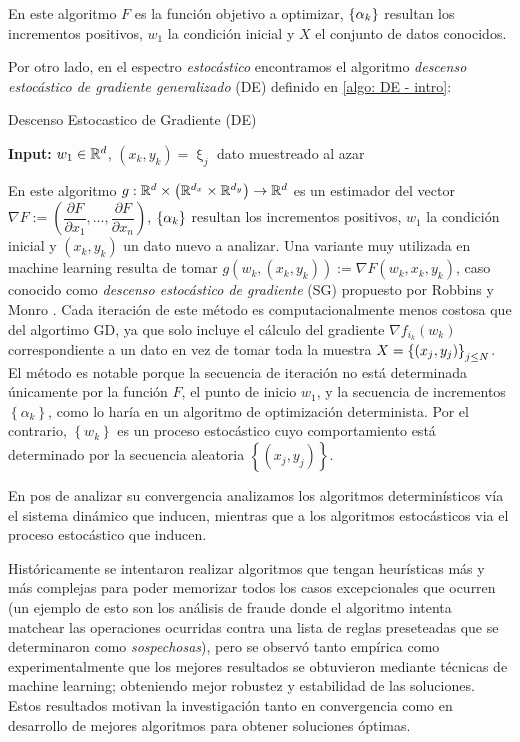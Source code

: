 En este algoritmo $F$ es la funci\'on objetivo a optimizar, $\left\lbrace\alpha_k\right\rbrace$ resultan los incrementos positivos, $w_1$ la condici\'on inicial y $X$ el conjunto de datos conocidos. 

Por otro lado, en el espectro \textit{estoc\'astico} encontramos el algoritmo \textit{descenso estoc\'astico de gradiente generalizado} (DE) definido en \ref{algo: DE - intro}:

 \LinesNumbered
 \begin{algorithm}[H]
 	\caption{Descenso Estocastico de Gradiente (DE) \label{algo: DE - intro}}
 	\textbf{Input:} $w_1 \in {\mathbb{R}}^d$, $(x_k, y_k) = \upxi_j$ dato muestreado al azar\\
 \end{algorithm}

En este algoritmo $g : {\mathbb{R}}^d \times \left( {\mathbb{R}}^{d_x} \times {\mathbb{R}}^{d_y} \right) \rightarrow {\mathbb{R}}^d$ es un estimador del vector $\nabla F := \left(\dfrac{\partial F}{\partial x_1}, \dots, \dfrac{\partial F}{\partial x_n}\right)$, $\left\lbrace\alpha_k\right\rbrace$ resultan los incrementos positivos, $w_1$ la condici\'on inicial y $(x_k, y_k)$ un dato nuevo a analizar. Una variante muy utilizada en machine learning resulta de tomar $g(w_k, \left(x_k, y_k\right)) := \nabla F(w_k, x_k, y_k)$, caso conocido como \textit{descenso estoc\'astico de gradiente} (SG) propuesto por Robbins y Monro \cite{robbins:1951}. Cada iteraci\'on de este m\'etodo es computacionalmente menos costosa que del algortimo GD, ya que solo incluye el c\'alculo del gradiente $\nabla f_{i_k} (w_k)$ correspondiente a un dato en vez de tomar toda la muestra $X = \left\lbrace(x_j,y_j)\right\rbrace_{j \leq N}$. El m\'etodo es notable porque la secuencia de iteraci\'on no est\'a determinada \'unicamente por la funci\'on $F$, el punto de inicio $w_1$, y la secuencia de incrementos $\left\lbrace \alpha _k \right\rbrace $, como lo har\'ia en un algoritmo de optimizaci\'on determinista. Por el contrario, $\left\lbrace w_k \right\rbrace $ es un proceso estoc\'astico cuyo comportamiento est\'a determinado por la secuencia aleatoria $\left\lbrace (x_j, y_j) \right\rbrace $.

En pos de analizar su convergencia analizamos los algoritmos determin\'isticos v\'ia el sistema din\'amico que inducen, mientras que a los algoritmos estoc\'asticos via el proceso estoc\'astico que inducen.

Hist\'oricamente se intentaron realizar algoritmos que tengan heur\'isticas m\'as y m\'as complejas para poder memorizar todos los casos excepcionales que ocurren (un ejemplo de esto son los an\'alisis de fraude donde el algoritmo intenta matchear las operaciones ocurridas contra una lista de reglas preseteadas que se determinaron como \textit{sospechosas}), pero se observ\'o tanto emp\'irica como experimentalmente que los mejores resultados se obtuvieron mediante t\'ecnicas de machine learning; obteniendo mejor robustez y estabilidad de las soluciones. Estos resultados motivan la investigaci\'on tanto en convergencia como en desarrollo de mejores algoritmos para obtener soluciones \'optimas.

